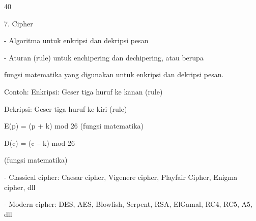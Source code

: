 \documentclass{article}
\begin{document}

40

7.  Cipher

 -  Algoritma untuk enkripsi dan dekripsi pesan 

 -  Aturan (rule) untuk enchipering dan  dechipering, atau berupa

    fungsi matematika yang digunakan untuk enkripsi dan dekripsi  pesan.

   Contoh:   Enkripsi: Geser tiga huruf ke kanan     (rule)


         Dekripsi: Geser tiga huruf ke kiri          (rule) 


         E(p) = (p + k) mod 26                 (fungsi matematika)


         D(c) = (c – k) mod 26 

          (fungsi matematika)


   - Classical cipher: Caesar cipher, Vigenere cipher, Playfair Cipher, Enigma cipher, dll

   - Modern cipher: DES, AES, Blowfish, Serpent, RSA, ElGamal, RC4, RC5, A5, dll
\end{document}
